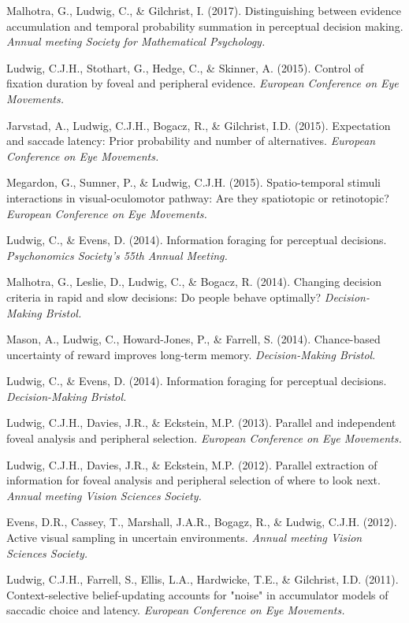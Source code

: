 \documentclass[a4paper, 10pt]{article}
\renewenvironment{itemize}{
  \begin{list}{}{
    \setlength{\leftmargin}{1.5em}
  }
}{
  \end{list}
}
\begin{document}
\begin{itemize}
\item Malhotra, G., Ludwig, C., \& Gilchrist, I. (2017). Distinguishing between evidence accumulation and temporal probability summation in perceptual decision making. \textit{Annual meeting Society for Mathematical Psychology.}
\item Ludwig, C.J.H., Stothart, G., Hedge, C., \& Skinner, A. (2015). Control of fixation duration by foveal and peripheral evidence. \textit{European Conference on Eye Movements.}
\item Jarvstad, A., Ludwig, C.J.H., Bogacz, R., \& Gilchrist, I.D. (2015). Expectation and saccade latency: Prior probability and number of alternatives. \textit{European Conference on Eye Movements.}
\item Megardon, G., Sumner, P., \& Ludwig, C.J.H. (2015). Spatio-temporal stimuli interactions in visual-oculomotor pathway: Are they spatiotopic or retinotopic? \textit{European Conference on Eye Movements.}
\item Ludwig, C., \& Evens, D. (2014). Information foraging for perceptual decisions. \textit{Psychonomics Society's 55th Annual Meeting.}
\item Malhotra, G., Leslie, D., Ludwig, C., \& Bogacz, R. (2014). Changing decision criteria in rapid and slow decisions: Do people behave optimally? \textit{Decision-Making Bristol.}
\item Mason, A., Ludwig, C., Howard-Jones, P., \& Farrell, S. (2014). Chance-based uncertainty of reward improves long-term memory. \textit{Decision-Making Bristol}.
\item Ludwig, C., \& Evens, D. (2014). Information foraging for perceptual decisions. \textit{Decision-Making Bristol.}
\item Ludwig, C.J.H., Davies, J.R., \& Eckstein, M.P. (2013). Parallel and independent foveal analysis and peripheral selection. {\it European Conference on Eye Movements.}
\item Ludwig, C.J.H., Davies, J.R., \& Eckstein, M.P. (2012). Parallel extraction of information for foveal analysis and peripheral selection of where to look next. {\it Annual meeting Vision Sciences Society.}
\item Evens, D.R., Cassey, T., Marshall, J.A.R., Bogagz, R., \& Ludwig, C.J.H. (2012). Active visual sampling in uncertain environments. {\it Annual meeting Vision Sciences Society.}
\item Ludwig, C.J.H., Farrell, S., Ellis, L.A., Hardwicke, T.E., \& Gilchrist, I.D. (2011). Context-selective belief-updating accounts for "noise" in accumulator models of saccadic choice and latency. {\it European Conference on Eye Movements.}

\end{itemize}
\end{document}
